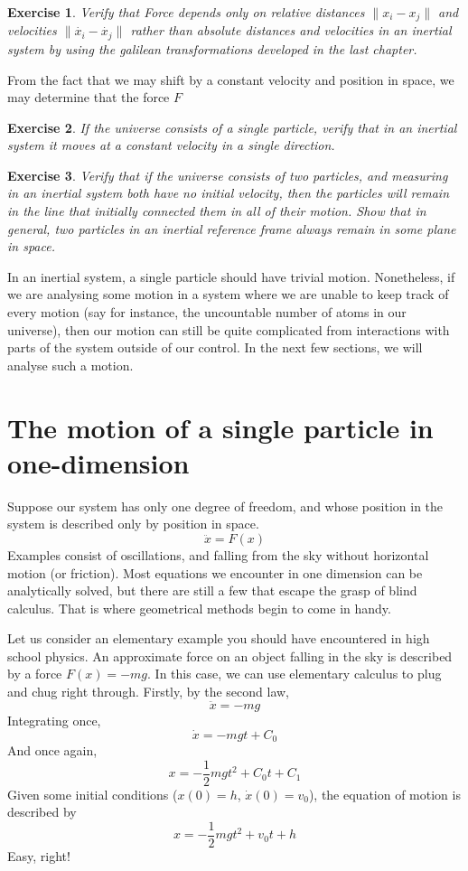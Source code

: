 \documentclass{article}
\newtheorem{exercise}{Exercise}
\begin{document}
\begin{exercise}
    Verify that Force depends only on relative distances $\|x_i - x_j\|$ and velocities $\|\dot{x_i} - \dot{x_j} \|$ rather than absolute distances and velocities in an inertial system by using the galilean transformations developed in the last chapter.
\end{exercise}

From the fact that we may shift by a constant velocity and position in space, we may determine that the force $F$

\begin{exercise}
    If the universe consists of a single particle, verify that in an inertial system it moves at a constant velocity in a single direction.
\end{exercise}

\begin{exercise}
    Verify that if the universe consists of two particles, and measuring in an inertial system both have no initial velocity, then the particles will remain in the line that initially connected them in all of their motion. Show that in general, two particles in an inertial reference frame always remain in some plane in space.
\end{exercise}

In an inertial system, a single particle should have trivial motion. Nonetheless, if we are analysing some motion in a system where we are unable to keep track of every motion (say for instance, the uncountable number of atoms in our universe), then our motion can still be quite complicated from interactions with parts of the system outside of our control. In the next few sections, we will analyse such a motion.

\section{The motion of a single particle in one-dimension}

Suppose our system has only one degree of freedom, and whose position in the system is described only by position in space.
%
\[ \ddot{x} = F(x) \]
%
Examples consist of oscillations, and falling from the sky without horizontal motion (or friction). Most equations we encounter in one dimension can be analytically solved, but there are still a few that escape the grasp of blind calculus. That is where geometrical methods begin to come in handy.

Let us consider an elementary example you should have encountered in high school physics. An approximate force on an object falling in the sky is described by a force $F(x) = -mg$. In this case, we can use elementary calculus to plug and chug right through. Firstly, by the second law,
%
\[ \ddot{x} = -mg \]
%
Integrating once,
%
\[ \dot{x} = -mgt + C_0 \]
%
And once again,
%
\[ x = -\frac{1}{2}mgt^2 + C_0t + C_1 \]
%
Given some initial conditions ($x(0) = h$, $\dot{x}(0) = v_0$), the equation of motion is described by
%
\[ x = -\frac{1}{2}mgt^2 + v_0t + h \]
%
Easy, right!
\end{document}
